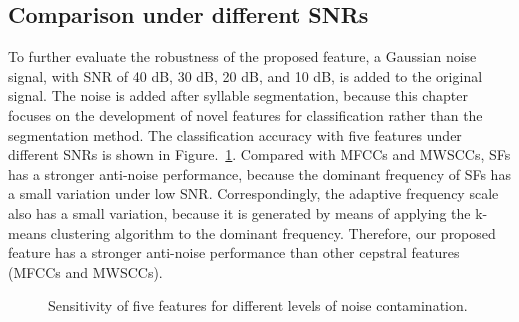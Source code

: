 \begin{table}[htb!]
\centering
\caption{Classification accuracy (\%) for classifying different number of frog species with four feature sets.}
\label{tab:manySpecies}
\end{table}


\subsection{Comparison under different SNRs}
To further evaluate the robustness of the proposed feature, a Gaussian noise signal, with SNR of 40 dB, 30 dB, 20 dB, and 10 dB, is added to the original signal. The noise is added after syllable segmentation, because this chapter focuses on the development of novel features for classification rather than the segmentation method. The classification accuracy with five features under different SNRs is shown in Figure.~\ref{fig:snr}. Compared with MFCCs and MWSCCs, SFs has a stronger anti-noise performance, because the dominant frequency of SFs has a small variation under low SNR. Correspondingly, the adaptive frequency scale also has a small variation, because it is generated by means of applying the k-means clustering algorithm to the dominant frequency. Therefore, our proposed feature has a stronger anti-noise performance than other cepstral features (MFCCs and MWSCCs). 

\begin{figure}[htb!] %
\caption{Sensitivity of five features for
different levels of noise contamination.}
\label{fig:snr} 
\end{figure}

